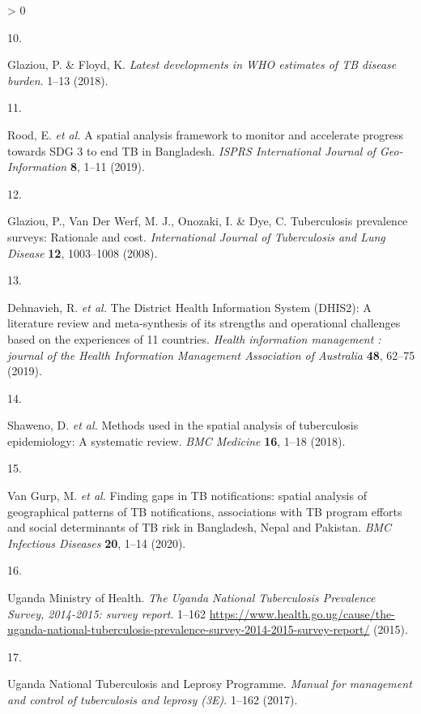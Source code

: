\documentclass[
]{article}
\newlength{\cslhangindent}
\newlength{\csllabelwidth}
\newenvironment{CSLReferences}[2] %
 {%
  \setlength{\parindent}{0pt}
  \ifodd #1 \everypar{\setlength{\hangindent}{\cslhangindent}}\ignorespaces\fi
  \ifnum #2 > 0
  \setlength{\parskip}{#2\baselineskip}
  \fi
 }%
 {}
\newcommand{\CSLLeftMargin}[1]{\parbox[t]{\csllabelwidth}{#1}}
\newcommand{\CSLRightInline}[1]{\parbox[t]{\linewidth - \csllabelwidth}{#1}\break}
\begin{document}
\begin{CSLReferences}{0}{0}
\leavevmode\hypertarget{ref-Glaziou2018a}{}%
\CSLLeftMargin{10. }
\CSLRightInline{Glaziou, P. \& Floyd, K. \emph{{Latest developments in WHO estimates of TB disease burden}}. 1--13 (2018).}

\leavevmode\hypertarget{ref-Rood2019}{}%
\CSLLeftMargin{11. }
\CSLRightInline{Rood, E. \emph{et al.} {A spatial analysis framework to monitor and accelerate progress towards SDG 3 to end TB in Bangladesh}. \emph{ISPRS International Journal of Geo-Information} \textbf{8}, 1--11 (2019).}

\leavevmode\hypertarget{ref-Glaziou2008}{}%
\CSLLeftMargin{12. }
\CSLRightInline{Glaziou, P., Van Der Werf, M. J., Onozaki, I. \& Dye, C. {Tuberculosis prevalence surveys: Rationale and cost}. \emph{International Journal of Tuberculosis and Lung Disease} \textbf{12}, 1003--1008 (2008).}

\leavevmode\hypertarget{ref-Dehnavieh2019}{}%
\CSLLeftMargin{13. }
\CSLRightInline{Dehnavieh, R. \emph{et al.} {The District Health Information System (DHIS2): A literature review and meta-synthesis of its strengths and operational challenges based on the experiences of 11 countries}. \emph{Health information management : journal of the Health Information Management Association of Australia} \textbf{48}, 62--75 (2019).}

\leavevmode\hypertarget{ref-Shaweno2018}{}%
\CSLLeftMargin{14. }
\CSLRightInline{Shaweno, D. \emph{et al.} {Methods used in the spatial analysis of tuberculosis epidemiology: A systematic review}. \emph{BMC Medicine} \textbf{16}, 1--18 (2018).}

\leavevmode\hypertarget{ref-VanGurp2020}{}%
\CSLLeftMargin{15. }
\CSLRightInline{Van Gurp, M. \emph{et al.} {Finding gaps in TB notifications: spatial analysis of geographical patterns of TB notifications, associations with TB program efforts and social determinants of TB risk in Bangladesh, Nepal and Pakistan}. \emph{BMC Infectious Diseases} \textbf{20}, 1--14 (2020).}

\leavevmode\hypertarget{ref-UgandaMinistryofHealth2015}{}%
\CSLLeftMargin{16. }
\CSLRightInline{Uganda Ministry of Health. \emph{{The Uganda National Tuberculosis Prevalence Survey, 2014-2015: survey report}}. 1--162 \url{https://www.health.go.ug/cause/the-uganda-national-tuberculosis-prevalence-survey-2014-2015-survey-report/} (2015).}

\leavevmode\hypertarget{ref-UgandaNationalTuberculosisandLeprosyProgramme2017}{}%
\CSLLeftMargin{17. }
\CSLRightInline{Uganda National Tuberculosis and Leprosy Programme. \emph{{Manual for management and control of tuberculosis and leprosy (3E)}}. 1--162 (2017).}


\end{CSLReferences}
\end{document}
